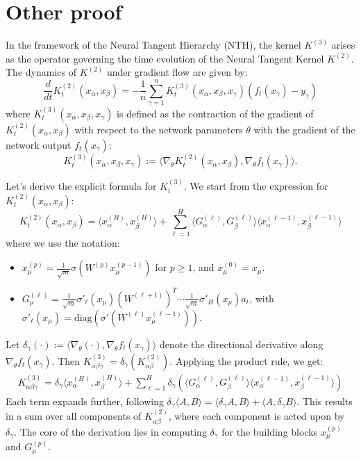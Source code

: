 \documentclass[11pt,a4paper]{article}
\theoremstyle{definition}
\begin{document}
\section{Other proof}

In the framework of the Neural Tangent Hierarchy (NTH), the kernel $K^{(3)}$ arises as the operator governing the time evolution of the Neural Tangent Kernel $K^{(2)}$. The dynamics of $K^{(2)}$ under gradient flow are given by:
\begin{equation}
\frac{d}{dt} K^{(2)}_t(x_\alpha, x_\beta) = -\frac{1}{n} \sum_{\gamma=1}^n K^{(3)}_t(x_\alpha, x_\beta, x_\gamma) (f_t(x_\gamma) - y_\gamma)
\end{equation}
where $K^{(3)}_t(x_\alpha, x_\beta, x_\gamma)$ is defined as the contraction of the gradient of $K^{(2)}_t(x_\alpha, x_\beta)$ with respect to the network parameters $\theta$ with the gradient of the network output $f_t(x_\gamma)$:
\begin{equation}
K^{(3)}_t(x_\alpha, x_\beta, x_\gamma) := \langle \nabla_\theta K^{(2)}_t(x_\alpha, x_\beta), \nabla_\theta f_t(x_\gamma) \rangle.
\end{equation}

Let's derive the explicit formula for $K^{(3)}_t$. We start from the expression for $K^{(2)}_t(x_\alpha, x_\beta)$:
\begin{equation}
K^{(2)}_t(x_\alpha, x_\beta) = \langle x^{(H)}_\alpha, x^{(H)}_\beta \rangle + \sum_{\ell=1}^{H} \langle G^{(\ell)}_\alpha, G^{(\ell)}_\beta \rangle \langle x^{(\ell-1)}_\alpha, x^{(\ell-1)}_\beta \rangle
\end{equation}
where we use the notation:
\begin{itemize}
    \item $x^{(p)}_\mu = \frac{1}{\sqrt{m}}\sigma(W^{(p)} x^{(p-1)}_\mu)$ for $p \ge 1$, and $x^{(0)}_\mu = x_\mu$.
    \item $G^{(\ell)}_\mu = \frac{1}{\sqrt{m}}\sigma'_\ell(x_\mu) (W^{(\ell+1)})^T \cdots \frac{1}{\sqrt{m}}\sigma'_H(x_\mu) a_t$, with $\sigma'_\ell(x_\mu) = \text{diag}(\sigma'(W^{(\ell)}x^{(\ell-1)}_\mu))$.
\end{itemize}

Let $\delta_\gamma(\cdot) := \langle \nabla_\theta (\cdot), \nabla_\theta f_t(x_\gamma) \rangle$ denote the directional derivative along $\nabla_\theta f_t(x_\gamma)$. Then $K^{(3)}_{\alpha\beta\gamma} = \delta_\gamma(K^{(2)}_{\alpha\beta})$. Applying the product rule, we get:
\begin{align}
K^{(3)}_{\alpha\beta\gamma} = \delta_\gamma \langle x^{(H)}_\alpha, x^{(H)}_\beta \rangle + \sum_{\ell=1}^{H} \delta_\gamma \left( \langle G^{(\ell)}_\alpha, G^{(\ell)}_\beta \rangle \langle x^{(\ell-1)}_\alpha, x^{(\ell-1)}_\beta \rangle \right)
\end{align}
Each term expands further, following $\delta_\gamma \langle A, B \rangle = \langle \delta_\gamma A, B \rangle + \langle A, \delta_\gamma B \rangle$. This results in a sum over all components of $K^{(2)}_{\alpha\beta}$, where each component is acted upon by $\delta_\gamma$. The core of the derivation lies in computing $\delta_\gamma$ for the building blocks $x^{(p)}_\mu$ and $G^{(p)}_\mu$.
\end{document}

